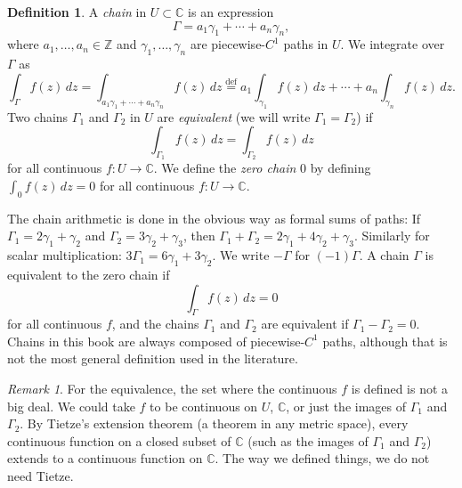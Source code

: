 \documentclass[12pt,openany]{book}
\newcommand{\glsadd}[2][]{}
\newcommand{\C}{{\mathbb{C}}}
\newcommand{\Z}{{\mathbb{Z}}}
\newcommand{\myindex}[1]{#1\index{#1}}
\theoremstyle{plain}
\theoremstyle{remark}
\newtheorem{remark}[thm]{Remark}
\theoremstyle{definition}
\newtheorem{defn}[thm]{Definition}
\theoremstyle{exercise}
\theoremstyle{example}
\begin{document}
\begin{defn}
A \emph{\myindex{chain}} in $U \subset \C$ is an expression
\begin{equation*}
\Gamma = a_1 \gamma_1 + \cdots + a_n \gamma_n ,
\end{equation*}
where $a_1,\ldots,a_n \in \Z$ and $\gamma_1,\ldots,\gamma_n$
are piecewise-$C^1$ paths in $U$.  We integrate over $\Gamma$ as
\glsadd{not:cycleint}%
\begin{equation*}
\int_{\Gamma} f(z) \, dz
=
\int_{a_1 \gamma_1 + \cdots + a_n \gamma_n} f(z) \, dz
\overset{\text{def}}{=}
a_1 \int_{\gamma_1} f(z) \, dz +
\cdots
+
a_n \int_{\gamma_n} f(z) \, dz .
\end{equation*}
Two chains $\Gamma_1$ and $\Gamma_2$ in 
$U$ are
\emph{equivalent} (we will write
\glsadd{not:cycleeq}%
$\Gamma_1=\Gamma_2$) if
\begin{equation*}
\int_{\Gamma_1} f(z) \, dz = 
\int_{\Gamma_2} f(z) \, dz
\end{equation*}
for all continuous $f \colon U \to \C$.
We define the \emph{\myindex{zero chain}} $0$ by defining 
$\int_0 f(z) \, dz = 0$ for all continuous $f \colon U \to \C$.
\end{defn}

The chain arithmetic is done in the obvious way as formal sums of paths:
If $\Gamma_1 = 2 \gamma_1 + \gamma_2$ and $\Gamma_2 = 3 \gamma_2 +
\gamma_3$, then $\Gamma_1 + \Gamma_2 = 2 \gamma_1 + 4 \gamma_2 + \gamma_3$.
Similarly for scalar multiplication: $3 \Gamma_1 = 6 \gamma_1 + 3 \gamma_2$.
\glsadd{not:cycleneg}%
We write $-\Gamma$ for $(-1)\Gamma$.
A chain $\Gamma$ is equivalent to the zero chain if
\begin{equation*}
\int_\Gamma f(z)\, dz = 0
\end{equation*}
for all continuous $f$, and
the chains $\Gamma_1$ and $\Gamma_2$ are equivalent if $\Gamma_1 - \Gamma_2 = 0$.
Chains in this book are always composed of piecewise-$C^1$ paths,
although that is not the most general definition used in the literature.

\begin{remark}
For the equivalence,
the set where the continuous $f$ is defined is not a big deal.  We could
take $f$ to be continuous on $U$, $\C$, or just the images of
$\Gamma_1$ and $\Gamma_2$.
By Tietze's extension theorem (a theorem in any metric space),
every continuous function on a closed subset of
$\C$ (such as the images of $\Gamma_1$ and $\Gamma_2$) extends to a
continuous function on $\C$.
The way we defined things, we do not need Tietze.
\end{remark}
\end{document}
